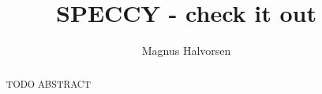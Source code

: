 \documentclass[a4paper]{report}
\title{SPECCY - check it out}
\author{Magnus Halvorsen}
\begin{document}

\setcounter{page}{0}

\begin{abstract}


TODO ABSTRACT

\end{abstract}
\tableofcontents
\listoffigures
\listoftables
\setcounter{page}{0}









%
\end{document}
